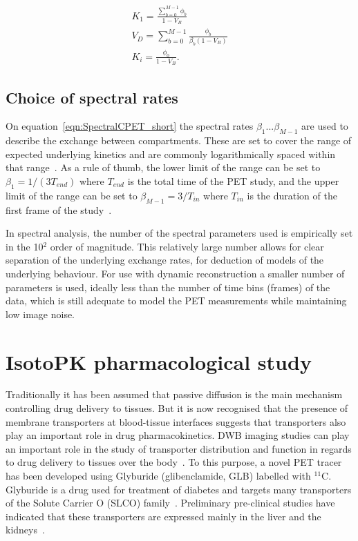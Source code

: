 \begin{subequations}
\label{eqn:AllSpectralEqns}
\begin{align}
K_1 = \frac{\sum_{b=0}^{M-1} {\phi_b}}{1-{V_{B}}}   \\  
V_D = \sum_{b=0}^{M-1} \frac {\phi_b}{\beta_b (1-V_{B})} \\
K_i = \frac{\phi_0}{1-V_{B}} .
\end{align}
\label{eqn:SpectralCPET_AllEquations}
\end{subequations}
%
\subsection{Choice of spectral rates}
%
On equation~\ref{eqn:SpectralCPET_short} the spectral rates $\beta_1 ... \beta_{M-1}$ are used to describe the exchange between compartments. These are set to cover the range of expected underlying kinetics and are commonly logarithmically spaced within that range~\cite{Gunn2002}.
As a rule of thumb, the lower limit of the range can be set to $\beta_1 = 1/(3 T_{end})$ where $T_{end}$ is the total time of the PET study, and the upper limit of the range can be set to $\beta_{M-1} = 3/T_{in}$ where $T_{in}$ is the duration of the first frame of the study~\cite{Veronese2016}.

In spectral analysis, the number of the spectral parameters used is empirically set in the 10$^2$ order of magnitude. This relatively large number allows for clear separation of the underlying exchange rates, for deduction of models of the underlying behaviour. 
For use with dynamic reconstruction a smaller number of parameters is used, ideally less than the number of time bins (frames) of the data, which is still adequate to model the PET measurements while maintaining low image noise.

\section{IsotoPK pharmacological study}
Traditionally it has been assumed that passive diffusion is the main mechanism controlling drug delivery to tissues. 
But it is now recognised that the presence of membrane transporters at blood-tissue interfaces suggests that transporters also play an important role in drug pharmacokinetics. DWB imaging studies can play an important role in the study of transporter distribution and function in regards to drug delivery to tissues over the body~\cite{Marie2017}. 
To this purpose, a novel PET tracer has been developed using Glyburide (glibenclamide, GLB) labelled with $^{11}$C. Glyburide is a drug used for treatment of diabetes and targets many transporters of the Solute Carrier O (SLCO) family~\cite{Tournier2013,Caille2020}. Preliminary pre-clinical studies have indicated that these transporters are expressed mainly in the liver and the kidneys~\cite{Tournier2013}.

